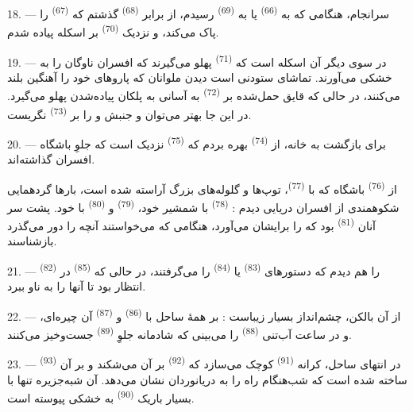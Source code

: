 18. --- سرانجام، هنگامی که به  \textsuperscript{(66)}
یا به  \textsuperscript{(69)} رسیدم، از برابر
 \textsuperscript{(68)} گذشتم که 
\textsuperscript{(67)} را پاک می‌کند، و نزدیک 
\textsuperscript{(70)} بر اسکله پیاده شدم.

19. --- در سوی دیگر آن اسکله است که 
\textsuperscript{(71)} پهلو می‌گیرند که افسران ناوگان را به خشکی
می‌آورند. تماشای ستودنی است دیدن ملوانان که پاروهای خود را آهنگین
بلند می‌کنند، در حالی که قایق حمل‌شده بر 
\textsuperscript{(72)} به آسانی به پلکان پیاده‌شدن پهلو می‌گیرد. در این
جا بهتر می‌توان  و جنبش  و 
را بر  \textsuperscript{(73)} نگریست.

\VUsaut{3.0mm}
\VUsaut{3.0mm}

20. --- برای بازگشت به خانه، از 
\textsuperscript{(74)} بهره بردم که 
\textsuperscript{(75)} نزدیک  است که جلوِ باشگاه افسران
گذاشته‌اند.

از  \textsuperscript{(76)} باشگاه که با 
\textsuperscript{(77)}، توپ‌ها و گلوله‌های بزرگ آراسته شده است، بارها
گردهمایی شکوهمندی از افسران دریایی دیدم : 
\textsuperscript{(78)} با شمشیر خود، 
\textsuperscript{(79)} و 
\textsuperscript{(80)} با  خود. پشت سر آنان
 \textsuperscript{(81)} بود که  را
برایشان می‌آورد، هنگامی که می‌خواستند آنچه را دور می‌گذرد بازشناسند.

21. ---  \textsuperscript{(82)} را هم دیدم که
دستورهای  \textsuperscript{(83)} یا 
\textsuperscript{(84)} را می‌گرفتند، در حالی که 
\textsuperscript{(85)} در انتظار بود تا آنها را به ناو ببرد.

22. --- از آن بالکن، چشم‌انداز بسیار زیباست : بر همهٔ ساحل با
 \textsuperscript{(86)} و 
\textsuperscript{(87)} آن چیره‌ای، و در ساعت آب‌تنی
 \textsuperscript{(88)} را می‌بینی که شادمانه جلوِ
 \textsuperscript{(89)} جست‌وخیز می‌کنند.

23. --- در انتهای ساحل، کرانه 
\textsuperscript{(91)} کوچک  می‌سازد که
 \textsuperscript{(92)} بر آن می‌شکند و بر آن
 \textsuperscript{(93)} ساخته شده است که
شب‌هنگام راه را به دریانوردان نشان می‌دهد. آن شبه‌جزیره تنها با
 بسیار باریک \textsuperscript{(90)} به خشکی پیوسته
است.

